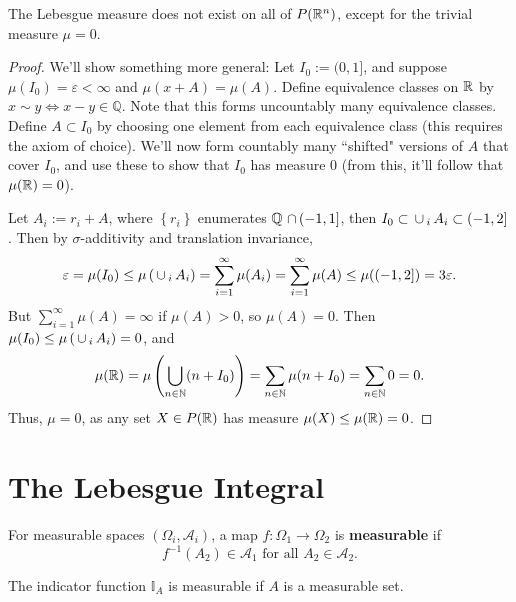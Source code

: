 \documentclass[twoside,10pt]{article}
\begin{document}
\begin{prop}
	The Lebesgue measure does not exist on all of $P(\mathbb{R}^{n})$, except for the trivial measure $\mu=0$.
\end{prop}
\begin{proof}
	We'll show something more general: Let $I_0 := (0, 1]$, and suppose $\mu( I_0 ) = \varepsilon < \infty$ and $\mu(x + A) = \mu(A)$. Define equivalence classes on $\mathbb{R}$ by $x\sim y  \iff x-y \in \mathbb{Q}$. Note that this forms uncountably many equivalence classes. Define $A \subset I_0$ by choosing one element from each equivalence class (this requires the axiom of choice). We'll now form countably many ``shifted" versions of $A$ that cover $I_0$, and use these to show that $I_{0}$ has measure 0 (from this, it'll follow that $\mu(\mathbb{R}) = 0$).

	Let $A_{i} := r_{i} + A$, where $\left\{ r_{i} \right\}$ enumerates $\mathbb{Q} \operatorname{\,\cap\,} (-1, 1]$, then $I_0 \subset \operatorname{\,\cup\,}_{i}A_{i} \subset (-1, 2]$. Then by $\sigma$-additivity and translation invariance,
	\[
	\varepsilon = \mu(I_0) \leq \mu\left( \operatorname{\,\cup\,}_{i}A_{i} \right) = \sum_{i=1}^{\infty} \mu(A_{i}) = \sum_{i=1}^{\infty} \mu(A) \leq \mu( (-1, 2] ) = 3\varepsilon.
	\] 
	But $\sum_{i=1}^{\infty}\mu(A) = \infty$ if $\mu(A) > 0$, so $\mu(A) = 0$. Then $\mu(I_0) \leq \mu\left( \operatorname{\,\cup\,}_{i}A_{i} \right) = 0$, and
	\[
	\mu(\mathbb{R}) = \mu\left( \bigcup_{n \in \mathbb{N}} (n + I_0) \right) = \sum_{n \in \mathbb{N}} \mu(n + I_0) =  \sum_{n \in \mathbb{N}} 0 = 0.
	\] 
	Thus, $\mu = 0$, as any set $X \in P(\mathbb{R})$ has measure $\mu(X) \leq \mu(\mathbb{R}) = 0$.
\end{proof}

\section{The Lebesgue Integral}

\begin{defn}[]
For measurable spaces $(\Omega_i,\mathcal{A}_{i})$, a map $f:\Omega_1\to \Omega_2$ is \textbf{measurable} if
\[
f^{-1}(A_2) \in \mathcal{A}_{1} \text{ for all } A_2 \in \mathcal{A}_{2}.
\]
\end{defn}

\begin{ex}[]
The indicator function $\mathbb{I}_{A}$ is measurable if $A$ is a measurable set.
\end{ex}
\end{document}
